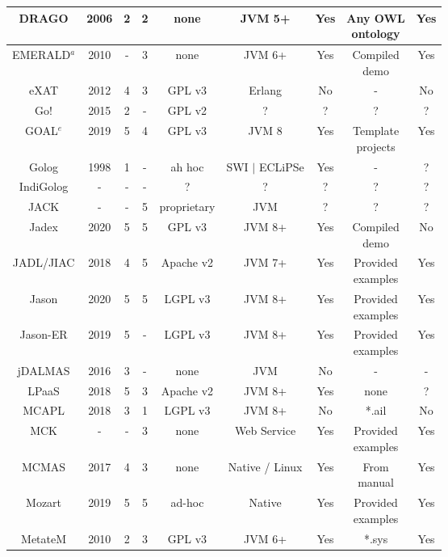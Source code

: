 \begin{table}
\begin{adjustbox}{width=.8\textwidth,center}
\begin{tabular}{c|cccccccc}
\hline
DRAGO & 2006 & 2 & 2 & none & JVM 5+ & Yes & \makecell{Any OWL\\ontology} & Yes \\
\hline
EMERALD$^a$ & 2010 & - & 3 & none & JVM 6+ & Yes & \makecell{Compiled\\demo} & Yes \\
\hline
eXAT & 2012 & 4 & 3 & GPL v3 & Erlang & No & - & No \\
\hline
Go! & 2015 & 2 & - & GPL v2 & ? & ? & ? & ? \\
\hline
GOAL$^e$ & 2019 & 5 & 4 & GPL v3 & JVM 8 & Yes & \makecell{Template\\projects} & Yes \\
\hline
Golog & 1998 & 1 & - & ah hoc & SWI $\mid$ ECLiPSe & Yes & - & ? \\
\hline
IndiGolog & - & - & - & ? & ? & ? & ? & ? \\
\hline
JACK & - & - & 5 & proprietary & JVM & ? & ? & ? \\
\hline
Jadex & 2020 & 5 & 5 & GPL v3 & JVM 8+ & Yes & \makecell{Compiled\\demo} & No \\
\hline
JADL/JIAC & 2018 & 4 & 5 & Apache v2 & JVM 7+ & Yes & \makecell{Provided\\examples} & Yes \\
\hline
Jason & 2020 & 5 & 5 & LGPL v3 & JVM 8+ & Yes & \makecell{Provided\\examples} & Yes \\
\hline
Jason-ER & 2019 & 5 & - & LGPL v3 & JVM 8+ & Yes & \makecell{Provided\\examples} & Yes \\
\hline
jDALMAS & 2016 & 3 & - & none & JVM & No & - & - \\
\hline
LPaaS & 2018 & 5 & 3 & Apache v2 & JVM 8+ & Yes & none & ? \\
\hline
MCAPL & 2018 & 3 & 1 & LGPL v3 & JVM 8+ & No & *.ail & No \\
\hline
MCK & - & - & 3 & none & Web Service & Yes & \makecell{Provided\\examples} & Yes \\
\hline
MCMAS & 2017 & 4 & 3 & none & Native / Linux & Yes & \makecell{From\\manual} & Yes \\
\hline
Mozart & 2019 & 5 & 5 & ad-hoc & Native & Yes & \makecell{Provided\\examples} & Yes \\
\hline
MetateM & 2010 & 2 & 3 & GPL v3 & JVM 6+ & Yes & *.sys & Yes \\

\end{tabular}
\end{adjustbox}
\end{table}
